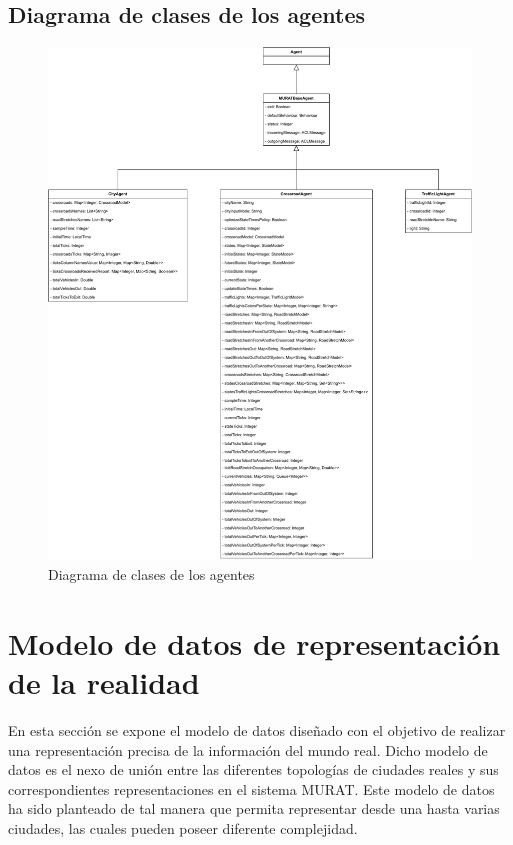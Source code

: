 \subsection{Diagrama de clases de los agentes}
\begin{figure}[H]
    \centering
    \includegraphics[width=1\linewidth]{text/image/DAgen-DC.pdf}
    \caption{Diagrama de clases de los agentes}
    \label{fig:dc_agentes}
\end{figure}

\newpage
\section{Modelo de datos de representación de la realidad}
En esta sección se expone el modelo de datos diseñado con el objetivo de realizar una representación precisa de la información del mundo real. Dicho modelo de datos es el nexo de unión entre las diferentes topologías de ciudades reales y sus correspondientes representaciones en el sistema MURAT. Este modelo de datos ha sido planteado de tal manera que permita representar desde una hasta varias ciudades, las cuales pueden poseer diferente complejidad.

